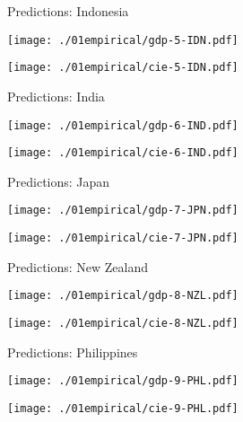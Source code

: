\documentclass[notes,blackandwhite,mathsans,usenames,dvipsnames]{beamer}
\begin{document}
\begin{frame}{Predictions: Indonesia}

\begin{center}
\texttt{[image: ./01empirical/gdp-5-IDN.pdf]}

\texttt{[image: ./01empirical/cie-5-IDN.pdf]}
\end{center}
\end{frame}




\begin{frame}{Predictions: India}

\begin{center}
\texttt{[image: ./01empirical/gdp-6-IND.pdf]}

\texttt{[image: ./01empirical/cie-6-IND.pdf]}
\end{center}
\end{frame}



\begin{frame}{Predictions: Japan}

\begin{center}
\texttt{[image: ./01empirical/gdp-7-JPN.pdf]}

\texttt{[image: ./01empirical/cie-7-JPN.pdf]}
\end{center}
\end{frame}



\begin{frame}{Predictions: New Zealand}

\begin{center}
\texttt{[image: ./01empirical/gdp-8-NZL.pdf]}

\texttt{[image: ./01empirical/cie-8-NZL.pdf]}
\end{center}
\end{frame}



\begin{frame}{Predictions: Philippines}

\begin{center}
\texttt{[image: ./01empirical/gdp-9-PHL.pdf]}

\texttt{[image: ./01empirical/cie-9-PHL.pdf]}
\end{center}
\end{frame}
\end{document}
